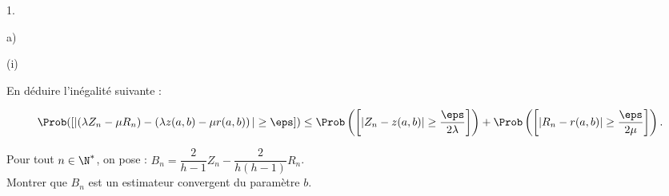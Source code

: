 \documentclass[11pt]{article}%
\begin{document}
\begin{noliste}{1.}
\begin{noliste}{a)}
\begin{noliste}{(i)}
    
	
	
	
	
      
    \item En déduire l'inégalité suivante :
    \end{noliste}
    \[
    \Prob([\vert(\lambda Z_n-\mu R_n)-\left(\lambda z(a,b) -\mu
      r(a,b)\right)\vert \geq \eps ]) \leq \Prob\left(\left[ \vert
        Z_n-z(a,b)\vert \geq \dfrac{\eps}{2\lambda}\right]\right) +
    \Prob\left(\left[\vert R_n-r(a,b)\vert \geq
        \dfrac{\eps}{2\mu}\right]\right).
    \]
    
    
    
  \item Pour tout $n\in\N^*$, on pose : $B_n=\dfrac{2}{h-1}Z_n -
    \dfrac{2}{h(h-1)}R_n$.\\
    Montrer que $B_n$ est un estimateur convergent du paramètre $b$.
    
    
  \end{noliste}
\end{noliste}

% 
\end{document}
